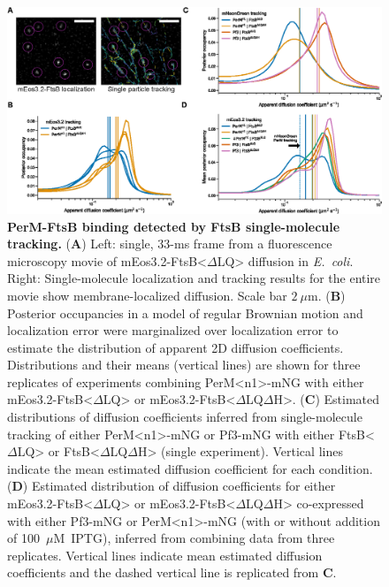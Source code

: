 \documentclass[pdflatex,sn-nature]{sn-jnl}%
\def\textsuperscript#1{<#1>}%
\newcommand\ec{\textit{E.~coli}}
\newcommand\ftsbdLQ{FtsB\textsuperscript{$\Delta{}$LQ}}
\newcommand\ftsbdLQdH{FtsB\textsuperscript{$\Delta{}$LQ$\Delta{}$H}}
\newcommand\permN{PerM\textsuperscript{n1}}
\begin{document}
\begin{figure}[t]
    \centering
    \includegraphics[width=1.0\textwidth]{./fig5.eps}
    \caption{
        \textbf{PerM-FtsB binding detected by FtsB single-molecule tracking.}
        (\textbf{A}) Left: single, 33-ms frame from a fluorescence microscopy movie of mEos3.2-\ftsbdLQ{} diffusion in \ec{}. Right: Single-molecule localization and tracking results for the entire movie show membrane-localized diffusion. Scale bar $2~\mu$m.
        (\textbf{B}) Posterior occupancies in a model of regular Brownian motion and localization error were marginalized over localization error to estimate the distribution of apparent 2D diffusion coefficients. Distributions and their means (vertical lines) are shown for three replicates of experiments combining \permN{}-mNG with either mEos3.2-\ftsbdLQ{} or mEos3.2-\ftsbdLQdH{}.
        (\textbf{C}) Estimated distributions of diffusion coefficients inferred from single-molecule tracking of either \permN{}-mNG or Pf3-mNG with either \ftsbdLQ{} or \ftsbdLQdH{} (single experiment). Vertical lines indicate the mean estimated diffusion coefficient for each condition.
        (\textbf{D}) Estimated distribution of diffusion coefficients for either mEos3.2-\ftsbdLQ{} or mEos3.2-\ftsbdLQdH{} co-expressed with either Pf3-mNG or \permN{}-mNG (with or without addition of 100~$\mu$M~IPTG), inferred from combining data from three replicates. Vertical lines indicate mean estimated diffusion coefficients and the dashed vertical line is replicated from \textbf{C}.
    }\label{fig5}
\end{figure}
\end{document}
